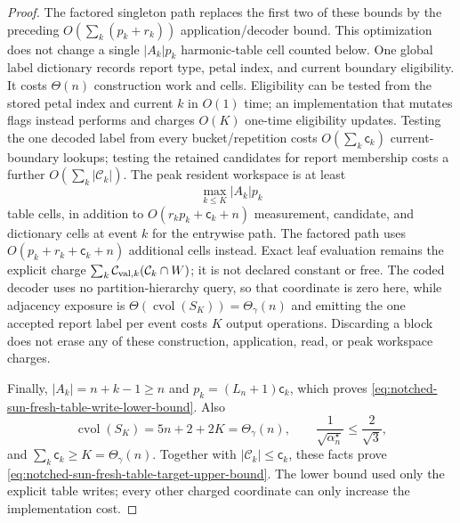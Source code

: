 \begin{proof}
The factored singleton path replaces the first two of these bounds by the
preceding $O(\sum_k(p_k+r_k))$ application/decoder bound.  This optimization
does not change a single $|A_k|p_k$ harmonic-table cell counted below.
One global label dictionary records report type, petal index, and current
boundary eligibility.  It costs $\Theta(n)$ construction work and cells.
Eligibility can be tested from the stored petal index and current $k$ in
$O(1)$ time; an implementation that mutates flags instead performs and charges
$O(K)$ one-time eligibility updates.
Testing the one decoded label from every bucket/repetition costs
$O(\sum_k\mathsf c_k)$ current-boundary lookups; testing the retained
candidates for report membership costs a further
$O(\sum_k|\mathcal C_k|)$.  The peak resident workspace is at least
\begin{equation*}
 \max_{k\leq K}|A_k|p_k
\end{equation*}
table cells, in addition to $O(r_kp_k+\mathsf c_k+n)$ measurement, candidate,
and dictionary cells at event $k$ for the entrywise path.  The factored path
uses $O(p_k+r_k+\mathsf c_k+n)$ additional cells instead.  Exact leaf
evaluation remains the explicit
charge
$\sum_k\mathcal C_{{\rm val},k}(\mathcal C_k\cap W)$; it is not declared
constant or free.  The coded decoder uses no partition-hierarchy query, so
that coordinate is zero here, while adjacency exposure is
$\Theta(\operatorname{cvol}(S_K))=\Theta_\gamma(n)$ and emitting the one
accepted report label per event costs $K$ output operations.  Discarding a
block does not erase any of these construction, application, read, or peak
workspace charges.

Finally, $|A_k|=n+k-1\geq n$ and
$p_k=(L_n+1)\mathsf c_k$, which proves
\cref{eq:notched-sun-fresh-table-write-lower-bound}.  Also
\begin{equation*}
 \operatorname{cvol}(S_K)=5n+2+2K=\Theta_\gamma(n),
 \qquad
 \frac1{\sqrt{\alpha_n^\star}}\leq\frac2{\sqrt3},
\end{equation*}
and $\sum_k\mathsf c_k\geq K=\Theta_\gamma(n)$.  Together with
$|\mathcal C_k|\leq\mathsf c_k$, these facts prove
\cref{eq:notched-sun-fresh-table-target-upper-bound}.  The lower bound used
only the explicit table writes; every other charged coordinate can only
increase the implementation cost.
\end{proof}

